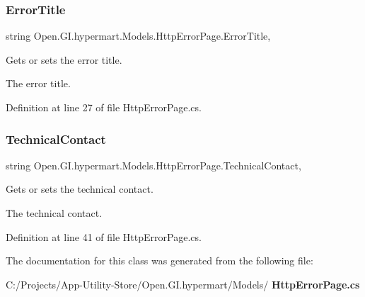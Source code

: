 \mbox{\label{class_open_1_1_g_i_1_1hypermart_1_1_models_1_1_http_error_page_a5b8d76394892e084e31faf6781f88d61}} 
\subsubsection{Error\+Title}
{\footnotesize\ttfamily string Open.\+G\+I.\+hypermart.\+Models.\+Http\+Error\+Page.\+Error\+Title\hspace{0.3cm}{\ttfamily [get]}, {\ttfamily [set]}}



Gets or sets the error title. 

The error title. 

Definition at line 27 of file Http\+Error\+Page.\+cs.

\mbox{\label{class_open_1_1_g_i_1_1hypermart_1_1_models_1_1_http_error_page_a0db493a849f0b8a35064d1c48e736cec}} 
\subsubsection{Technical\+Contact}
{\footnotesize\ttfamily string Open.\+G\+I.\+hypermart.\+Models.\+Http\+Error\+Page.\+Technical\+Contact\hspace{0.3cm}{\ttfamily [get]}, {\ttfamily [set]}}



Gets or sets the technical contact. 

The technical contact. 

Definition at line 41 of file Http\+Error\+Page.\+cs.



The documentation for this class was generated from the following file\+:\begin{DoxyCompactItemize}
\item 
C\+:/\+Projects/\+App-\/\+Utility-\/\+Store/\+Open.\+G\+I.\+hypermart/\+Models/\textbf{ Http\+Error\+Page.\+cs}\end{DoxyCompactItemize}
